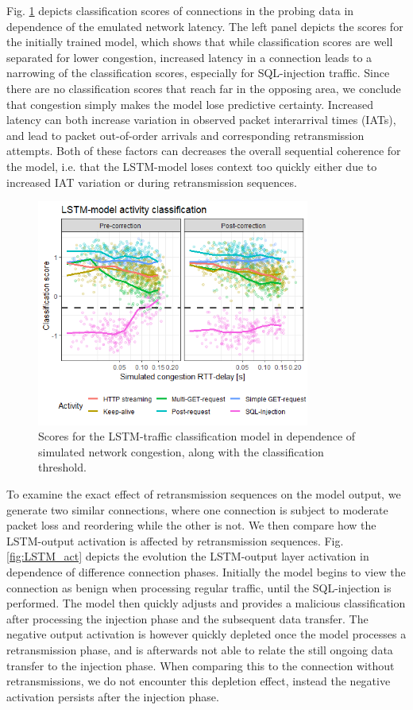 \documentclass[runningheads]{llncs}
\begin{document}
Fig. \ref{fig:LSTM_exp} depicts classification scores of connections in the probing data in dependence of the emulated network latency. The left panel depicts the scores for the initially trained model, which shows that while classification scores are well separated for lower congestion, increased latency in a connection leads to a narrowing of the classification scores, especially for SQL-injection traffic. Since there are no classification scores that reach far in the opposing area, we conclude that congestion simply makes the model lose predictive certainty. 
Increased latency can both increase variation in observed packet interarrival times (IATs), and lead to packet out-of-order arrivals and corresponding retransmission attempts. Both of these factors can decreases the overall sequential coherence for the model, i.e. that the LSTM-model loses context too quickly either due to increased IAT variation or during retransmission sequences. 


\begin{figure}
\centering
\includegraphics[width=0.8\textwidth]{images/LSTM_classi.png}
\caption{Scores for the LSTM-traffic classification model in dependence of simulated network congestion, along with the classification threshold. }\label{fig:LSTM_exp}
\end{figure}

To examine the exact effect of retransmission sequences on the model output, we generate two similar connections, where one connection is subject to moderate packet loss and reordering while the other is not. We then compare how the LSTM-output activation is affected by retransmission sequences. Fig. \ref{fig:LSTM_act} depicts the evolution the LSTM-output layer activation in dependence of difference connection phases. Initially the model begins to view the connection as benign when processing regular traffic, until the SQL-injection is performed. The model then quickly adjusts and provides a malicious classification after processing the injection phase and the subsequent data transfer. The negative output activation is however quickly depleted once the model processes a retransmission phase, and is afterwards not able to relate the still ongoing data transfer to the injection phase. When comparing this to the connection without retransmissions, we do not encounter this depletion effect, instead the negative activation persists after the injection phase.
\end{document}
